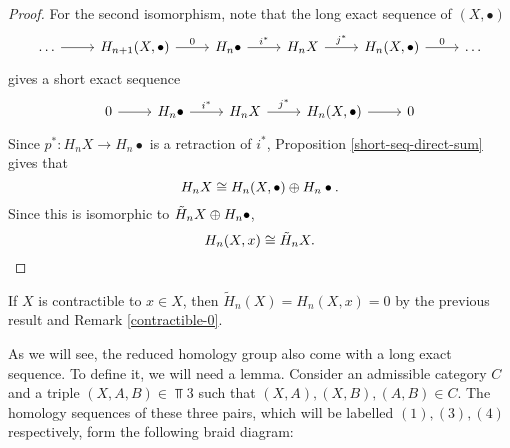 \begin{proof}
For the second isomorphism, note that the long exact sequence of $(X,\bullet)$
\[\begin{tikzcd}
\dots \arrow[r] & {H_{n+1}(X,\bullet)} \arrow[r, "0"] & H_n\bullet \arrow[r, "i^*"] & H_nX \arrow[r, "j^*"] & {H_n(X,\bullet)} \arrow[r, "0"] & \dots
\end{tikzcd}\]
gives a short exact sequence
\[\begin{tikzcd}
0 \arrow[r] & H_n\bullet \arrow[r, "i^*"] & H_nX \arrow[r, "j^*"] & {H_n(X,\bullet)} \arrow[r] & 0
\end{tikzcd}\]
Since $p^*:H_nX\rightarrow H_n\bullet$ is a retraction of $i^*$, Proposition \ref{short-seq-direct-sum} gives that $$H_nX\cong H_n(X,\bullet)\oplus H_n\bullet.$$ Since this is isomorphic to $\tilde{H}_nX\oplus H_n\bullet$, $$H_n(X,x)\cong \tilde{H}_nX.$$
\end{proof}

\begin{corollary}
If $X$ is contractible to $x\in X$, then $\tilde{H}_n(X)=H_n(X,x)=0$ by the previous result and Remark \ref{contractible-0}.
\end{corollary}


As we will see, the reduced homology group also come with a long exact sequence. To define it, we will need a lemma. Consider an admissible category $C$ and a triple $(X,A,B)\in \Top{3}$ such that $(X,A),(X,B),(A,B)\in C$. The homology sequences of these three pairs, which will be labelled $(1),(3),(4)$ respectively, form the following braid diagram:

